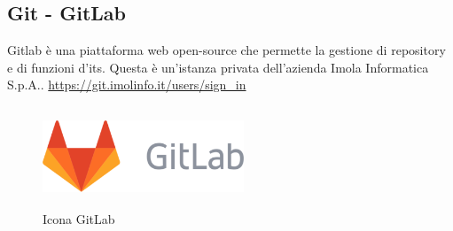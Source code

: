 \subsection*{Git - GitLab}
Gitlab è una piattaforma web open-source che permette la gestione di repository e di funzioni d'\gls{its}.
Questa è un'istanza privata dell'azienda Imola Informatica S.p.A..
\url{https://git.imolinfo.it/users/sign_in}
\begin{figure}[H]
    \centering
    \includegraphics[width=6cm, height=3cm]{./immagini/gitlab.png}
    \caption{Icona GitLab}\label{fig:gitlab}
\end{figure}
